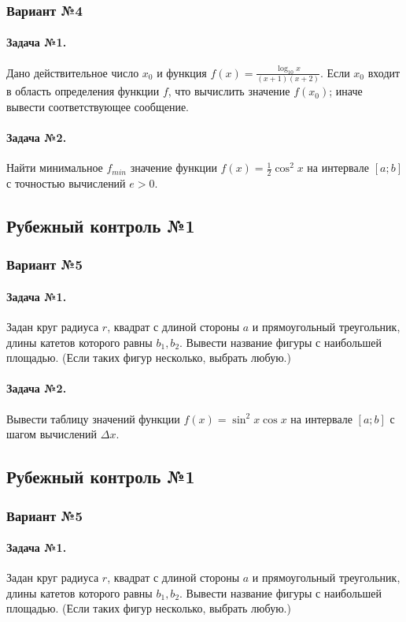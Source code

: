 \documentclass[12pt,a4paper]{report}
\begin{document}
\subsubsection*{Вариант №4}
\paragraph*{Задача №1.} Дано действительное число $x_0$ и функция $f(x) = \frac { \log_{10} x } {(x+1)(x+2)}$. Если $x_0$ входит в область определения функции $f$, что вычислить значение $f(x_0)$; иначе вывести соответствующее сообщение.
\paragraph*{Задача №2.} Найти минимальное $f_{min}$ значение функции $f(x)=\frac{1}{2} \cos^2 x$ на интервале $[a; b]$ с точностью вычислений $e>0$.

\clearpage
\subsection*{Рубежный контроль №1}
\subsubsection*{Вариант №5}
\paragraph*{Задача №1.} Задан круг радиуса $r$, квадрат с длиной стороны $a$ и прямоугольный треугольник, длины катетов которого равны $b_1, b_2$. Вывести название фигуры с наибольшей площадью. (Если таких фигур несколько, выбрать любую.)
\paragraph*{Задача №2.} Вывести таблицу значений функции $f(x) = \sin^2 x \cos x$ на интервале $[a; b]$ с шагом вычислений $\Delta x$.

\subsection*{Рубежный контроль №1}
\subsubsection*{Вариант №5}
\paragraph*{Задача №1.} Задан круг радиуса $r$, квадрат с длиной стороны $a$ и прямоугольный треугольник, длины катетов которого равны $b_1, b_2$. Вывести название фигуры с наибольшей площадью. (Если таких фигур несколько, выбрать любую.)
\end{document}
